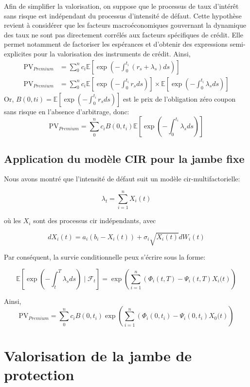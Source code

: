 Afin de simplifier la valorisation, on suppose que le processus de taux d’intérêt sans risque est indépendant du processus d’intensité de défaut. Cette hypothèse revient à considérer que les facteurs macroéconomiques gouvernant la dynamique des taux ne sont pas directement corrélés aux facteurs spécifiques de crédit. Elle permet notamment de factoriser les espérances et d’obtenir des expressions semi-explicites pour la valorisation des instruments de crédit. Ainsi,
\begin{align*}
    \mathrm{PV}_{Premium} &= \sum_0^n c_i \mathbb{E}[\exp(-\int_0^{t_i} (r_s + \lambda_s) ds)] \\
    \mathrm{PV}_{Premium} &= \sum_0^n c_i \mathbb{E}[\exp(-\int_0^{t_i} r_s ds)] \times \mathbb{E}[\exp(-\int_0^{t_i} \lambda_s ds)]
\end{align*}
Or, $B(0, ti) = \mathbb{E}[\exp(-\int_0^{t_i} r_s ds)]$ est le prix de l'obligation zéro coupon sans risque en l'absence d'arbitrage, donc:
\begin{equation}
    \mathrm{PV}_{Premium} = \sum_0^n c_i B(0, t_i) \mathbb{E}[\exp(-\int_0^{t_i} \lambda_s ds)]
    \label{eq:jambe_fixe_reduite}
\end{equation}


\subsection{Application du modèle CIR pour la jambe fixe}

Nous avons montré que l'intensité de défaut suit un modèle \gls{cir}-multifactorielle:

$$\lambda_t = \sum_{i = 1}^n X_i(t)$$

où les $X_i$ sont des processus \gls{cir} indépendants, avec

$$dX_i(t) = a_i(b_i - X_i(t)) + \sigma_i \sqrt{X_i(t)}dW_i(t)$$

Par conséquent, la survie conditionnelle peux s'écrire sous la forme:

$$\mathbb{E} [\exp(-\int_t^T \lambda_s ds) \mid \mathcal{F}_t] = \exp\left( \sum_{i = 1}^n \left( \Phi_i(t, T) - \Psi_i(t, T)X_i(t \right) \right)$$

Ainsi,
\begin{equation}
    \mathrm{PV}_{Premium} = \sum_0^n c_i B(0, t_i) \exp\left( \sum_{i = 1}^n \left( \Phi_i(0, t_i) - \Psi_i(0, t_i)X_0(t \right) \right)
    \label{eq:jambe_fixe}
\end{equation}


\section{Valorisation de la jambe de protection}

